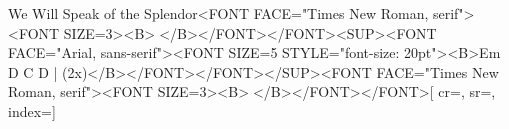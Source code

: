 {We Will Speak of the Splendor<FONT FACE="Times New Roman, serif"><FONT SIZE=3><B></B></FONT></FONT><SUP><FONT FACE="Arial, sans-serif"><FONT SIZE=5 STYLE="font-size: 20pt"><B>Em D C D | (2x)</B></FONT></FONT></SUP><FONT FACE="Times New Roman, serif"><FONT SIZE=3><B></B></FONT></FONT>}[
    cr={},
    sr={},
    index={}]
